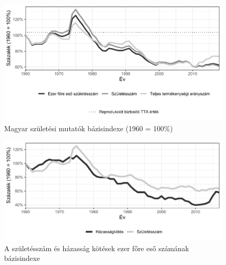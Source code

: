 \documentclass[
]{article}
\begin{document}
\begin{figure}
\centering
\includegraphics{ujdemografiaiprogram_files/figure-latex/unnamed-chunk-2-1.pdf}
\caption{Magyar születési mutatók bázisindexe (1960 = 100\%)}
\end{figure}

\begin{figure}
\centering
\includegraphics{ujdemografiaiprogram_files/figure-latex/unnamed-chunk-3-1.pdf}
\caption{A születésszám és házasság kötések ezer főre eső számának
bázisindexe}
\end{figure}
\end{document}
